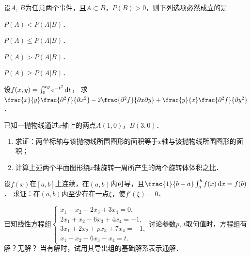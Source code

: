\documentclass[plain,noanswer,medmath]{../../template/jnuexam}
\begin{document}
\begin{problem}
设$A$, $B$为任意两个事件，且$A \subset B$，$P(B) > 0$，则下列选项必然成立的是
\begin{abcd}
\item $P(A) < P(A|B)$．
\item $P(A) \le P(A|B)$．
\item $P(A) > P(A|B)$．
\item $P(A) \ge P(A|B)$．
\end{abcd}
\end{problem}






\begin{problem}
设$f(x,y) = \int_0^{xy} \mathrm{e}^{- t^2} \mathop{}\!\mathrm{d} t$，
求$\frac{x}{y}\frac{\pd^2 f}{\pd x^2} - 2\frac{\pd^2 f}{\pdx\pd y}
+ \frac{y}{x}\frac{\pd^2 f}{\pd y^2}$．
\end{problem}









\begin{problem}
已知一抛物线通过$x$轴上的两点$A(1,0)$，$B(3,0)$．
\begin{enumerate}
\item 求证：两坐标轴与该抛物线所围图形的面积等于$x$轴与该抛物线所围图形的面积；
\item 计算上述两个平面图形绕$x$轴旋转一周所产生的两个旋转体体积之比．
\end{enumerate}
\end{problem}



\begin{problem}
设$f(x)$在$[a,b]$上连续，在$(a,b)$内可导，且$\frac{1}{b - a}\int_a^bf (x)\dx = f(b)$．
求证：在$(a,b)$内至少存在一点$\xi$，使$f'(\xi) = 0$．
\end{problem}



\begin{problem}
已知线性方程组$\begin{cases}
  x_1 + x_2 - 2x_3 + 3x_4 = 0, \\
  2x_1 + x_2 - 6x_3 + 4x_4 = - 1, \\
  3x_1 + 2x_2 + px_3 + 7x_4 = - 1, \\
  x_1 - x_2 - 6x_3 - x_4 = t.
\end{cases}$讨论参数$p$, $t$取何值时，方程组有解？无解？
当有解时，试用其导出组的基础解系表示通解．
\end{problem}
\end{document}
